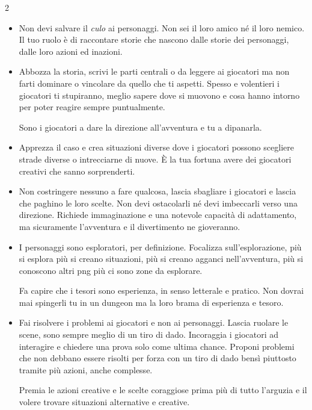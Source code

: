 \begin{multicols}{2}
\begin{itemize}[leftmargin=*]
Rispetta i dadi e i risultati ottenuti, come capiteranno ai giocatori capiteranno risultati particolari anche a te. È giusto così.

\item
Non devi salvare il \emph{culo} ai personaggi. Non sei il loro amico né il loro nemico. Il tuo ruolo è di raccontare storie che nascono dalle storie dei personaggi, dalle loro azioni ed inazioni.

\item
Abbozza la storia, scrivi le parti centrali o da leggere ai giocatori ma non farti dominare o vincolare da quello che ti aspetti. Spesso e volentieri i giocatori ti stupiranno, meglio sapere dove si muovono e cosa hanno intorno per poter reagire sempre puntualmente.

Sono i giocatori a dare la direzione all'avventura e tu a dipanarla.

\item
Apprezza il caso e crea situazioni diverse dove i giocatori possono scegliere strade diverse o intrecciarne di nuove. È la tua fortuna avere dei giocatori creativi che sanno sorprenderti.

\item
Non costringere nessuno a fare qualcosa, lascia sbagliare i giocatori e lascia che paghino le loro scelte. Non devi ostacolarli né devi imbeccarli verso una direzione. Richiede immaginazione e una notevole capacità di adattamento, ma sicuramente l'avventura e il divertimento ne gioveranno.

\item
I personaggi sono esploratori, per definizione. Focalizza sull'esplorazione, più si esplora più si creano situazioni, più si creano agganci nell'avventura, più si conoscono altri png più ci sono zone da esplorare.

Fa capire che i tesori sono esperienza, in senso letterale e pratico. Non dovrai mai spingerli tu in un dungeon ma la loro brama di esperienza e tesoro.

\item
Fai risolvere i problemi ai giocatori e non ai personaggi. Lascia ruolare le scene, sono sempre meglio di un tiro di dado. Incoraggia i giocatori ad interagire e chiedere una prova solo come ultima chance. Proponi problemi che non debbano essere risolti per forza con un tiro di dado bensì piuttosto tramite più azioni, anche complesse.

Premia le azioni creative e le scelte coraggiose prima più di tutto l'arguzia e il volere trovare situazioni alternative e creative.


\end{itemize}
\end{multicols}
